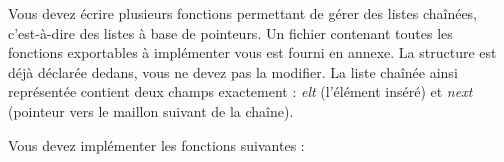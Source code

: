 

\vspace*{0.7cm}

\noindent {}

\bigskip

%

\noindent Vous devez écrire plusieurs fonctions permettant de gérer des listes chaînées, c'est-à-dire des listes à base de pointeurs.
Un fichier  contenant toutes les fonctions exportables à implémenter vous est fourni en annexe.
La structure  est déjà déclarée dedans, vous ne devez pas la modifier.
La liste chaînée ainsi représentée contient deux champs exactement : \textit{elt} (l'élément inséré) et \textit{next} (pointeur vers le maillon suivant de la chaîne).

\smallskip




\bigskip

\noindent Vous devez implémenter les fonctions suivantes :

\bigskip

